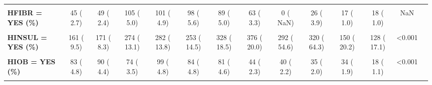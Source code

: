 \documentclass[
]{article}
\begin{document}
\begin{table}[H]
\begin{tabular}[t]{>{\raggedright\arraybackslash}p{5em}ccccccccccccc}
\textbf{\cellcolor{gray!10}{HEZET = YES (\%)}} & \cellcolor{gray!10}{0 (  NaN)} & \cellcolor{gray!10}{0 (  NaN)} & \cellcolor{gray!10}{1 (  0.0)} & \cellcolor{gray!10}{60 (  2.9)} & \cellcolor{gray!10}{21 (  1.2)} & \cellcolor{gray!10}{27 (  1.5)} & \cellcolor{gray!10}{43 (  2.3)} & \cellcolor{gray!10}{0 (  NaN)} & \cellcolor{gray!10}{40 (  5.8)} & \cellcolor{gray!10}{175 ( 10.0)} & \cellcolor{gray!10}{374 ( 21.3)} & \cellcolor{gray!10}{NaN} & \cellcolor{gray!10}{}\\
\textbf{HFIBR = YES (\%)} & 45 (  2.7) & 49 (  2.4) & 105 (  5.0) & 101 (  4.9) & 98 (  5.6) & 89 (  5.0) & 63 (  3.3) & 0 (  NaN) & 26 (  3.9) & 17 (  1.0) & 18 (  1.0) & NaN & \\
\textbf{\cellcolor{gray!10}{HHEP = YES (\%)}} & \cellcolor{gray!10}{1323 ( 76.5)} & \cellcolor{gray!10}{926 ( 45.2)} & \cellcolor{gray!10}{861 ( 41.1)} & \cellcolor{gray!10}{855 ( 42.9)} & \cellcolor{gray!10}{639 ( 36.8)} & \cellcolor{gray!10}{769 ( 43.2)} & \cellcolor{gray!10}{1004 ( 53.3)} & \cellcolor{gray!10}{797 ( 44.7)} & \cellcolor{gray!10}{404 ( 37.1)} & \cellcolor{gray!10}{0 (  NaN)} & \cellcolor{gray!10}{0 (  NaN)} & \cellcolor{gray!10}{NaN} & \cellcolor{gray!10}{}\\
\textbf{HINSUL = YES (\%)} & 161 (  9.5) & 171 (  8.3) & 274 ( 13.1) & 282 ( 13.8) & 253 ( 14.5) & 328 ( 18.5) & 376 ( 20.0) & 292 ( 54.6) & 320 ( 64.3) & 150 ( 20.2) & 128 ( 17.1) & <0.001 & \\
\textbf{\cellcolor{gray!10}{HINTEG = YES (\%)}} & \cellcolor{gray!10}{84 (  5.1)} & \cellcolor{gray!10}{128 (  6.2)} & \cellcolor{gray!10}{352 ( 16.8)} & \cellcolor{gray!10}{542 ( 26.1)} & \cellcolor{gray!10}{521 ( 29.8)} & \cellcolor{gray!10}{425 ( 23.9)} & \cellcolor{gray!10}{231 ( 12.3)} & \cellcolor{gray!10}{0 (  NaN)} & \cellcolor{gray!10}{0 (  NaN)} & \cellcolor{gray!10}{0 (  NaN)} & \cellcolor{gray!10}{0 (  NaN)} & \cellcolor{gray!10}{NaN} & \cellcolor{gray!10}{}\\
\textbf{HIOB = YES (\%)} & 83 (  4.8) & 90 (  4.4) & 74 (  3.5) & 99 (  4.8) & 84 (  4.8) & 81 (  4.6) & 44 (  2.3) & 40 (  2.2) & 35 (  2.0) & 34 (  1.9) & 18 (  1.1) & <0.001 & \\
\textbf{\cellcolor{gray!10}{HISTORY = YES (\%)}} & \cellcolor{gray!10}{1293 ( 72.1)} & \cellcolor{gray!10}{1487 ( 72.6)} & \cellcolor{gray!10}{1541 ( 73.6)} & \cellcolor{gray!10}{1616 ( 77.9)} & \cellcolor{gray!10}{1342 ( 76.9)} & \cellcolor{gray!10}{1406 ( 79.0)} & \cellcolor{gray!10}{1474 ( 78.2)} & \cellcolor{gray!10}{1390 ( 77.6)} & \cellcolor{gray!10}{0 (  NaN)} & \cellcolor{gray!10}{0 (  NaN)} & \cellcolor{gray!10}{0 (  NaN)} & \cellcolor{gray!10}{NaN} & \cellcolor{gray!10}{}\\

\end{tabular}
\end{table}
\end{document}
